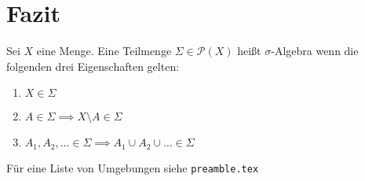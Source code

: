 \chapter{Fazit}
\label{ch:conclusion}

\Blindtext
\begin{definition}
    Sei $X$ eine Menge. Eine Teilmenge $\Sigma \in \mathcal{P}\left(X\right)$ heißt
    $\sigma$-Algebra wenn die folgenden drei Eigenschaften gelten: 
    \begin{enumerate}
        \item $X \in \Sigma$
        \item $A \in \Sigma \implies X \setminus A \in \Sigma$
        \item $A_1,A_2,\dots \in \Sigma \implies A_1 \cup A_2 \cup \dots \in \Sigma$
    \end{enumerate}
\end{definition}
Für eine Liste von Umgebungen siehe \texttt{preamble.tex}

